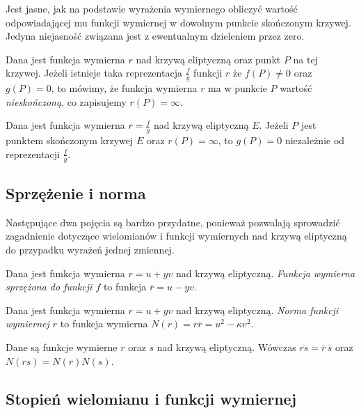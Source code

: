 Jest jasne, jak na podstawie wyrażenia wymiernego
obliczyć wartość odpowiadającej mu funkcji wymiernej
w dowolnym punkcie skończonym krzywej.
Jedyna niejasność związana jest z ewentualnym dzieleniem przez zero.

\begin{definition}
Dana jest funkcja wymierna $r$ nad krzywą eliptyczną
oraz punkt $P$ na tej krzywej.
Jeżeli istnieje taka reprezentacja $\frac{f}{g}$ funkcji $r$
że $f(P) \neq 0$ oraz $g(P) = 0$,
to mówimy, że funkcja wymierna $r$ ma w punkcie $P$
wartość \emph{nieskończoną},
co zapisujemy $r(P) = \infty$.
\end{definition}

\begin{theorem}
Dana jest funkcja wymierna $r = \frac{f}{g}$ nad krzywą eliptyczną $E$.
Jeżeli $P$ jest punktem skończonym krzywej $E$ oraz $r(P) = \infty$,
to $g(P) = 0$ niezależnie od reprezentacji $\frac{f}{g}$.
\end{theorem}

\subsection*{Sprzężenie i norma}

Następujące dwa pojęcia są bardzo przydatne,
ponieważ pozwalają sprowadzić
zagadnienie dotyczące wielomianów i funkcji wymiernych nad krzywą eliptyczną
do przypadku wyrażeń jednej zmiennej.

\begin{definition}
Dana jest funkcja wymierna $r = u + yv$ nad krzywą eliptyczną.
\emph{Funkcja wymierna sprzężona do funkcji $f$}
to funkcja $\overline{r} = u - yv$.
\end{definition}

\begin{definition}
Dana jest funkcja wymierna $r = u + yv$ nad krzywą eliptyczną.
\emph{Norma funkcji wymiernej $r$}
to funkcja wymierna $N(r) = r\overline{r} = u^2 - \kappa v^2$.
\end{definition}

\begin{fact}
Dane są funkcje wymierne $r$ oraz $s$ nad krzywą eliptyczną.
Wówczas $\overline{rs} = \overline{r}\,\overline{s}$
oraz $N(rs) = N(r)N(s)$.
\end{fact}

\subsection*{Stopień wielomianu i funkcji wymiernej}


